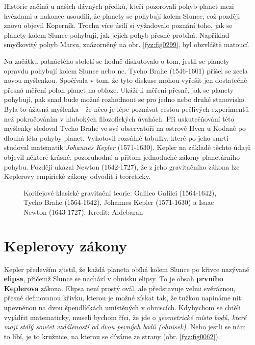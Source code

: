     Historie začíná u našich dávných předků, kteří pozorovali pohyb planet mezi hvězdami a nakonec 
    usoudili, že planety se pohybují kolem Slunce, což později znovu objevil Koperník. Trochu více 
    úsilí si vyžadovalo poznání toho, jak se planety kolem Slunce pohybují, jak jejich pohyb přesně 
    probíhá. Například smyčkovitý pohyb Marsu, znázorněný na obr. \ref{fyz:fig0299}, byl obzvláště 
    matoucí.
   
    Na začátku patnáctého století se hodně diskutovalo o tom, jestli se planety opravdu pohybují 
    kolem Slunce nebo ne. Tycho Brahe (1546-1601) přišel se zcela novou myšlenkou. Spočívala v tom, 
    že tyto diskuse mohou vyřešit jen dostatečně přesná měření poloh planet na obloze. Ukáží-li 
    měření přesně, jak se planety pohybují, pak snad bude možné rozhodnout se pro jedno nebo druhé 
    stanovisko. Byla to úžasná myšlenka - že něco je lépe poznávat cestou pečlivých experimentů než 
    pokračováním v hlubokých filozofických úvahách. Při uskutečňování této myšlenky sledoval Tycho 
    Brahe ve své observatoři na ostrově Hven u Kodaně po dlouhá léta pohyby planet. Vyhotovil 
    rozsáhlé tabulky, které po jeho smrti studoval matematik \emph{Johannes Kepler} (1571-1630). 
    Kepler na základě těchto údajů objevil některé krásné, pozoruhodné a přitom jednoduché zákony 
    planetárního pohybu. Později ukázal Newton (1642-1727), že z jeho gravitačního zákona lze 
    Keplerovy empirické zákony odvodit i teoreticky.

    \begin{figure}[ht!]  %
      \centering
      \caption{Korifejové klasické gravitační teorie: Galileo Galilei (1564-1642), Tycho Brahe
               (1564-1642), Johannes Kepler (1571-1630) a Isaac Newton (1643-1727). Kredit:
               Aldebaran}
      \label{fyz:fig0887}
    \end{figure}

    
  \section{Keplerovy zákony}
    Kepler především zjistil, že každá planeta obíhá kolem Slunce po křivce nazývané 
    \textbf{elipsa}, přičemž Slunce se nachází v ohnisku elipsy. To je obsah \textbf{prvního 
    Keplerova} zákona. Elipsa není prostý ovál, ale představuje velmi svéráznou, přesné definovanou 
    křivku, kterou je možné získat tak, že tužkou napínáme nit upevněnou na dvou špendlíčkách 
    umístěných v ohniscích. Kdybychom se chtěli vyjádřit matematicky, museli bychom říci, že jde o 
    \emph{geometrické místo bodů, které mají stálý součet vzdáleností od dvou pevných bodů 
    (ohnisek)}. Nebo jestli se nám to líbí, je to kružnice, na kterou se díváme ze strany (obr. 
    \ref{fyz:fig0062}).
    
